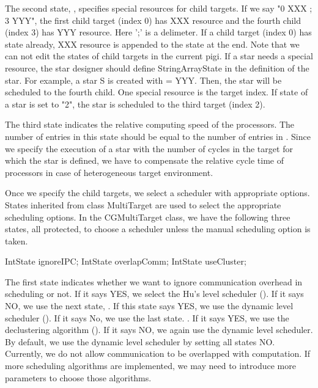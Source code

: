 The second state, , specifies special resources for child
targets. If we say "0 XXX ; 3 YYY", the first child target (index 0) has
XXX resource and the fourth child (index 3) has YYY resource. Here ';' is
a delimeter. If a child target (index 0) has  state already,
XXX resource is appended to the state at the end. Note that we can not edit
the states of child targets in the current pigi. If a star needs a special
resource, the star designer should define  StringArrayState
in the definition of the star. For example, a star S is created with
 = YYY. Then, the star will be scheduled to the fourth child.
One special resource is the target index. If  state of a
star is set to "2", the star is scheduled to the third target (index 2).

The third state indicates the relative computing speed of the processors.
The number of entries in this state should be equal to the number of
entries in . Since we specify the execution of a star
with the number of cycles in the target for which the star is defined,
we have to compensate the relative cycle time of processors in case of
heterogeneous target environment.

Once we specify the child targets, we select a scheduler with appropriate
options. States inherited from class MultiTarget are used to select
the appropriate scheduling options. In the CGMultiTarget class, we have
the following three states, all protected, to choose a scheduler unless
the manual scheduling option is taken.

\begin{example}
IntState ignoreIPC;
IntState overlapComm;
IntState useCluster;
\end{example}

The first state indicates whether we want to ignore communication overhead
in scheduling or not. If it says YES, we select the Hu's level scheduler
(). If it says NO, we use the next state,
. If this state says YES, we use the dynamic level scheduler
(). If it says No, we use the last state.
. If it says YES, we use the declustering algorithm
(). If it says NO, we again use the dynamic
level scheduler. By default, we use the dynamic level scheduler by setting
all states NO. Currently, we do not allow communication to be overlapped
with computation. If more scheduling algorithms are implemented, we may need
to introduce more parameters to choose those algorithms. 

